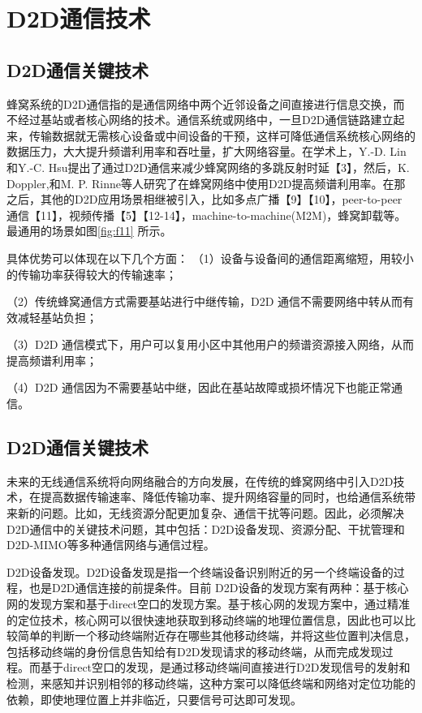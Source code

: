\documentclass[figurelist,tablelist,algorithmlist,nomlist,masters]{seuthesix}
\begin{document}
	\section{D2D通信技术}
	
	\subsection{D2D通信关键技术}
	蜂窝系统的D2D通信指的是通信网络中两个近邻设备之间直接进行信息交换，而不经过基站或者核心网络的技术。通信系统或网络中，一旦D2D通信链路建立起来，传输数据就无需核心设备或中间设备的干预，这样可降低通信系统核心网络的数据压力，大大提升频谱利用率和吞吐量，扩大网络容量。在学术上，Y.-D. Lin和Y.-C. Hsu提出了通过D2D通信来减少蜂窝网络的多跳反射时延【3】，然后，K. Doppler,和M. P. Rinne等人研究了在蜂窝网络中使用D2D提高频谱利用率。在那之后，其他的D2D应用场景相继被引入，比如多点广播【9】【10】，peer-to-peer 通信【11】，视频传播【5】【12-14】，machine-to-machine(M2M)，蜂窝卸载等。最通用的场景如图\ref{fig:f11} 所示。
	
	具体优势可以体现在以下几个方面：
	（1）设备与设备间的通信距离缩短，用较小的传输功率获得较大的传输速率；
	
	（2）传统蜂窝通信方式需要基站进行中继传输，D2D 通信不需要网络中转从而有效减轻基站负担；
	
	（3）D2D 通信模式下，用户可以复用小区中其他用户的频谱资源接入网络，从而提高频谱利用率；
	
	（4）D2D 通信因为不需要基站中继，因此在基站故障或损坏情况下也能正常通信。
	
	\subsection{D2D通信关键技术}
	未来的无线通信系统将向网络融合的方向发展，在传统的蜂窝网络中引入D2D技术，在提高数据传输速率、降低传输功率、提升网络容量的同时，也给通信系统带来新的问题。比如，无线资源分配更加复杂、通信干扰等问题。因此，必须解决D2D通信中的关键技术问题，其中包括：D2D设备发现、资源分配、干扰管理和D2D-MIMO等多种通信网络与通信过程。
	
	D2D设备发现。D2D设备发现是指一个终端设备识别附近的另一个终端设备的过程，也是D2D通信连接的前提条件。目前 D2D设备的发现方案有两种：基于核心网的发现方案和基于direct空口的发现方案。基于核心网的发现方案中，通过精准的定位技术，核心网可以很快速地获取到移动终端的地理位置信息，因此也可以比较简单的判断一个移动终端附近存在哪些其他移动终端，并将这些位置判决信息，包括移动终端的身份信息告知给有D2D发现请求的移动终端，从而完成发现过程。而基于direct空口的发现，是通过移动终端间直接进行D2D发现信号的发射和检测，来感知并识别相邻的移动终端，这种方案可以降低终端和网络对定位功能的依赖，即使地理位置上并非临近，只要信号可达即可发现。
	
\end{document}

